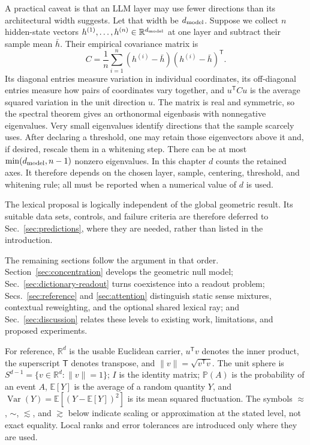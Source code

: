 \documentclass[
  aps,
  reprint,
  superscriptaddress,
  floatfix,
  nofootinbib,
  longbibliography
]{revtex4-2}
\newcommand{\R}{\mathbb{R}}
\newcommand{\E}{\mathbb{E}}
\newcommand{\Prob}{\mathbb{P}}
\newcommand{\Sph}[1]{S^{#1}}
\newcommand{\T}{^{\mathsf{T}}}
\newcommand{\norm}[1]{\lVert #1 \rVert}
\DeclareMathOperator{\Var}{Var}
\begin{document}
A practical caveat is that an LLM layer may use fewer directions than its
architectural width suggests.  Let that width be $d_{\rm model}$.  Suppose we
collect $n$ hidden-state vectors
$h^{(1)},\ldots,h^{(n)}\in\R^{d_{\rm model}}$ at one layer and subtract their sample mean $\bar h$.
Their empirical covariance matrix is
\begin{equation}
\label{eq:empirical-covariance}
C=\frac{1}{n}\sum_{i=1}^{n}
  (h^{(i)}-\bar h)(h^{(i)}-\bar h)\T .
\end{equation}
Its diagonal entries measure variation in individual coordinates, its
off-diagonal entries measure how pairs of coordinates vary together, and
$u\T C u$ is the average squared variation in the unit direction $u$.  The
matrix is real and symmetric, so the spectral theorem gives an orthonormal
eigenbasis with nonnegative eigenvalues.  Very small eigenvalues identify
directions that the sample scarcely uses.  After declaring a threshold, one
may retain those eigenvectors above it and, if desired, rescale them in a
whitening step.  There can be at most $\min(d_{\rm model},n-1)$ nonzero
eigenvalues.  In this chapter $d$ counts the retained axes.  It therefore
depends on the chosen layer, sample, centering, threshold, and whitening rule;
all must be reported when a numerical value of $d$ is used.

The lexical proposal is logically independent of the global geometric result.
Its suitable data sets, controls, and failure criteria are therefore deferred
to Sec.~\ref{sec:predictions}, where they are needed, rather than listed in the
introduction.

The remaining sections follow the argument in that order.
Section~\ref{sec:concentration} develops the geometric null model;
Sec.~\ref{sec:dictionary-readout} turns coexistence into a readout problem;
Secs.~\ref{sec:reference} and \ref{sec:attention} distinguish static sense
mixtures, contextual reweighting, and the optional shared lexical ray; and
Sec.~\ref{sec:discussion} relates these levels to existing work, limitations,
and proposed experiments.

For reference, $\R^d$ is the usable Euclidean carrier, $u\T v$ denotes the
inner product, the superscript $\mathsf T$ denotes transpose, and
$\norm{v}=\sqrt{v\T v}$.  The unit sphere is
$\Sph{d-1}=\{v\in\R^d:\norm v=1\}$; $I$ is the identity matrix;
$\Prob(A)$ is the probability of an event $A$, $\E[Y]$ is the average of a
random quantity $Y$, and
$\Var(Y)=\E[(Y-\E[Y])^2]$ is its mean squared fluctuation.  The
symbols $\approx$, $\sim$, $\lesssim$, and $\gtrsim$ below indicate scaling or
approximation at the stated level, not exact equality.  Local ranks and error
tolerances are introduced only where they are used.
\end{document}
